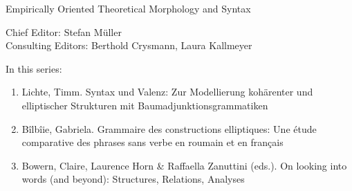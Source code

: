 {\large Em­pir­i­cal­ly Ori­ent­ed The­o­ret­i­cal Mor­phol­o­gy and Syn­tax}

\bigskip

Chief Editor: Stefan Müller \\
Consulting Editors: Berthold Crysmann, Laura Kallmeyer

\bigskip

In this series:

\begin{enumerate}
\item Lichte, Timm. Syntax und Valenz: Zur Modellierung kohärenter und elliptischer Strukturen mit Baumadjunktionsgrammatiken 
\item Bîlbîie, Gabriela. Grammaire des constructions elliptiques: Une étude comparative des phrases sans verbe en roumain et en français 
\item Bowern, Claire, Laurence Horn \& Raffaella Zanuttini (eds.). On looking into words (and beyond): Structures, Relations, Analyses

\end{enumerate}
